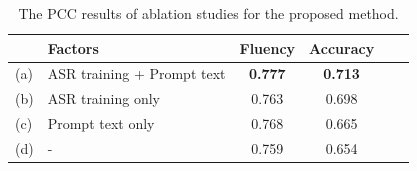 \begin{table}[ht]
\vspace{1pt}
  \centering
  \caption{The PCC results of ablation studies for the proposed method.}
   \label{table:ablation}
\begin{tabular}{llcccc}
\toprule
            &      \textbf{Factors}    & \textbf{Fluency} & \textbf{Accuracy}     \\ \midrule
       (a) & ASR training + Prompt text   &      \textbf{0.777}          &  \textbf{0.713}                 \\  
      (b) &         ASR training only      &   0.763    & 0.698           \\   
      (c) &          Prompt text only     &   0.768    & 0.665          \\  
      (d) &                      -      &    0.759    & 0.654          \\  

\bottomrule

\end{tabular}
\end{table}











